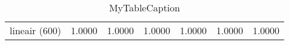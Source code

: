 \begin{table}
\centering
\begin{tabular}{|c|c|c|c|c|c|c|}
\hline
 &  &  &  &  &  &  \\
\hline
lineair (600) & 1.0000 & 1.0000 & 1.0000 & 1.0000 & 1.0000 & 1.0000 \\
\hline
\end{tabular}
\caption{MyTableCaption}
\label{table:MyTableLabel}
\end{table}
